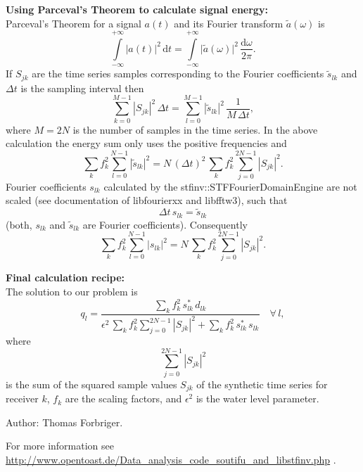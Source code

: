      \textbf{Using Parceval's Theorem to calculate signal energy:}\\
     Parceval's Theorem for a signal $a(t)$ and its Fourier transform 
     $\tilde{a}(\omega)$ is
     \begin{equation}
       \int\limits_{-\infty}^{+\infty}\bigl|a(t)\bigr|^2\,\textrm{d} t=
       \int\limits_{-\infty}^{+\infty}\bigl|\tilde{a}(\omega)\bigr|^2\,
         \frac{\textrm{d} \omega}{2\pi}.
     \end{equation}
     If $S_{jk}$ are the time series samples corresponding to the Fourier
     coefficients $\tilde{s}_{lk}$ and $\Delta t$ is the sampling
     interval then
     \begin{equation}
       \sum\limits_{k=0}^{M-1}\left|S_{jk}\right|^2\,\Delta t=
       \sum\limits_{l=0}^{M-1}\left|\tilde{s}_{lk}\right|^2\,\frac{1}{M\,\Delta t},
     \end{equation}
     where $M=2N$ is the number of samples in the time series.
     In the above calculation the energy sum only uses the positive
     frequencies and
     \begin{equation}
       \sum\limits_k f_k^2\sum\limits_{l=0}^{N-1}\left|\tilde{s}_{lk}\right|^2
       =
         N\,(\Delta t)^2\,
         \sum\limits_k f_k^2
         \sum\limits_{j=0}^{2N-1}\left|S_{jk}\right|^2.
     \end{equation}
     Fourier coefficients $s_{lk}$ calculated by the
     stfinv::STFFourierDomainEngine are not scaled (see documentation of
     libfourierxx and libfftw3), such that
     \begin{equation}
       \Delta t\,s_{lk}=\tilde{s}_{lk}
     \end{equation}
     (both, $s_{lk}$ and $\tilde{s}_{lk}$ are Fourier coefficients).
     Consequently
     \begin{equation}
       \sum\limits_k f_k^2\sum\limits_{l=0}^{N-1}\left|s_{lk}\right|^2
       =
         N\,
         \sum\limits_k f_k^2
         \sum\limits_{j=0}^{2N-1}\left|S_{jk}\right|^2.
     \end{equation}
    
     \textbf{Final calculation recipe:}\\
     The solution to our problem is
     \begin{equation}
       q_l=\frac{
         \sum\limits_{k}f_k^2\,s_{lk}^\ast\,d_{lk}
       }{
         \epsilon^2\,\sum\limits_k f_k^2
                    \sum\limits_{j=0}^{2N-1}\left|S_{jk}\right|^2
               +\sum\limits_{k}f_k^2\,s_{lk}^\ast\,s_{lk}
       }
       \quad\forall\, l,
     \end{equation}
     where
     \begin{equation}
       \sum\limits_{j=0}^{2N-1}\left|S_{jk}\right|^2
     \end{equation}
     is the sum of the squared sample values $S_{jk}$ of the synthetic
     time series for receiver $k$, $f_k$ are the scaling factors, and $\epsilon^2$
     is the water level parameter.
\newline
     
Author: Thomas Forbriger.
\newline

For more information see \href{http://www.opentoast.de/Data_analysis_code_soutifu_and_libstfinv.php}{http://www.opentoast.de/Data\_analysis\_code\_soutifu\_and\_libstfinv.php} .